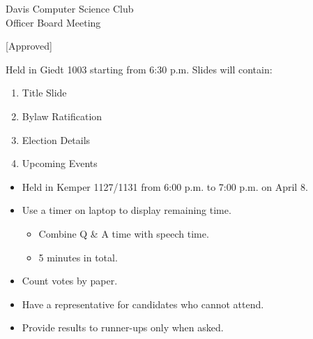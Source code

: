 \documentclass{article}
\begin{document}
\begin{Minutes}{Davis Computer Science Club\\Officer Board Meeting}

	






\maketitle

	
\begin{Vote}
	[Approved]
\end{Vote}
	

Held in Giedt 1003 starting from 6:30 p.m. Slides will contain:

\begin{enumerate}
	\item Title Slide
	\item Bylaw Ratification
	\item Election Details
	\item Upcoming Events
\end{enumerate}


\begin{itemize}
	\item Held in Kemper 1127/1131 from 6:00 p.m. to 7:00 p.m. on April 8. 
	\item Use a timer on laptop to display remaining time.
	\begin{itemize}
		\item Combine Q \& A time with speech time.
		\item 5 minutes in total.
	\end{itemize}
	\item Count votes by paper.
	\item Have a representative for candidates who cannot attend.
	\item Provide results to runner-ups only when asked.
\end{itemize}


\end{Minutes}
\end{document}
